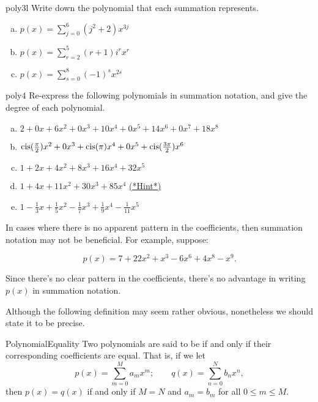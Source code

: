 \begin{exercise}{poly3l}
Write down the polynomial that each summation represents.
\begin{enumerate}[(a)]
\item
$p(x)  = \sum_{j=0}^{6}( j^2+2)x^{3j}$
\item
$p(x)  = \sum_{r=2}^{5} (r+1)i^rx^r$
\item
$p(x)  = \sum_{s=0}^{8} (-1)^sx^{2s}$
\end{enumerate}
\end{exercise}

\begin{exercise}{poly4}
Re-express the following polynomials in summation notation,  and give the degree of each polynomial.
\begin{enumerate}[(a)]
\item
$2 + 0x + 6x^2 + 0x^3 + 10x^4 + 0x^5 + 14x^6 +0x^7 +  18x^8$
\item
$\operatorname{cis}(\frac{\pi}{2})x^2 + 0x^3 + \operatorname{cis}(\pi)x^4 + 0x^5  + \operatorname{cis}(\frac{3\pi}{2})x^6$
\item
$1+ 2x + 4x^2 + 8x^3 + 16x^4 + 32x^5$
\item
$1+4x+11x^2+30x^3+85x^4$
\hyperref[sec:Polynomials:Hints]{(*Hint*)} 
\item
$1-\frac{1}{3}x + \frac{1}{5}x^2 - \frac{1}{7}x^3 + \frac{1}{9}x^4 - \frac{1}{11}x^5$
\end{enumerate}
\end{exercise}

\begin{rem}
In cases where there is no apparent pattern in the coefficients, then summation notation may not be beneficial. For example, suppose:


$$p(x) = 7+ 22x^2 + x^3-6x^6+4x^8-x^9.$$


Since there's no clear pattern in the coefficients, there's no advantage in writing $p(x)$ in summation notation.
\end{rem}
Although the following definition may seem rather obvious, nonetheless we should state it to be precise.

\begin{defn}{PolynomialEquality} Two polynomials are said to be   if and only if their corresponding coefficients are equal. That is, if we let    
$$
p(x)  = \sum^{M}_{m=0} a_m x^m; \qquad
q(x)  = \sum^{N}_{n=0} b_n x^n,
$$
then $p(x) = q(x)$ if and only if $M=N$ and $a_m = b_m$ for all $0 \leq m \leq M$.
\end {defn}

